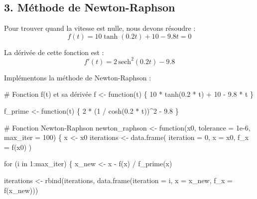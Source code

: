 \documentclass[
  12pt,
  letterpaper,
]{book}
\newenvironment{Shaded}{}{}
\newcommand{\AttributeTok}[1]{\textcolor[rgb]{0.84,0.23,0.29}{#1}}
\newcommand{\CommentTok}[1]{\textcolor[rgb]{0.42,0.45,0.49}{#1}}
\newcommand{\ControlFlowTok}[1]{\textcolor[rgb]{0.84,0.23,0.29}{#1}}
\newcommand{\DecValTok}[1]{\textcolor[rgb]{0.00,0.36,0.77}{#1}}
\newcommand{\FloatTok}[1]{\textcolor[rgb]{0.00,0.36,0.77}{#1}}
\newcommand{\FunctionTok}[1]{\textcolor[rgb]{0.44,0.26,0.76}{#1}}
\newcommand{\NormalTok}[1]{\textcolor[rgb]{0.14,0.16,0.18}{#1}}
\newcommand{\OtherTok}[1]{\textcolor[rgb]{0.44,0.26,0.76}{#1}}
\newcommand{\SpecialCharTok}[1]{\textcolor[rgb]{0.00,0.36,0.77}{#1}}
\theoremstyle{remark}
\begin{document}
\subsection{3. Méthode de
Newton-Raphson}\label{muxe9thode-de-newton-raphson}

Pour trouver quand la vitesse est nulle, nous devons résoudre :
\[f(t) = 10\tanh(0.2t) + 10 - 9.8t = 0\]

La dérivée de cette fonction est :
\[f'(t) = 2\,\text{sech}^2(0.2t) - 9.8\]

Implémentons la méthode de Newton-Raphson :

\begin{Shaded}
\begin{Highlighting}[]
\CommentTok{\# Fonction f(t) et sa dérivée}
\NormalTok{f }\OtherTok{\textless{}{-}} \ControlFlowTok{function}\NormalTok{(t) \{}
  \DecValTok{10} \SpecialCharTok{*} \FunctionTok{tanh}\NormalTok{(}\FloatTok{0.2} \SpecialCharTok{*}\NormalTok{ t) }\SpecialCharTok{+} \DecValTok{10} \SpecialCharTok{{-}} \FloatTok{9.8} \SpecialCharTok{*}\NormalTok{ t}
\NormalTok{\}}

\NormalTok{f\_prime }\OtherTok{\textless{}{-}} \ControlFlowTok{function}\NormalTok{(t) \{}
  \DecValTok{2} \SpecialCharTok{*}\NormalTok{ (}\DecValTok{1} \SpecialCharTok{/} \FunctionTok{cosh}\NormalTok{(}\FloatTok{0.2} \SpecialCharTok{*}\NormalTok{ t))}\SpecialCharTok{\^{}}\DecValTok{2} \SpecialCharTok{{-}} \FloatTok{9.8}
\NormalTok{\}}

\CommentTok{\# Fonction Newton{-}Raphson}
\NormalTok{newton\_raphson }\OtherTok{\textless{}{-}} \ControlFlowTok{function}\NormalTok{(x0, }\AttributeTok{tolerance =} \FloatTok{1e{-}6}\NormalTok{, }\AttributeTok{max\_iter =} \DecValTok{100}\NormalTok{) \{}
\NormalTok{  x }\OtherTok{\textless{}{-}}\NormalTok{ x0}
\NormalTok{  iterations }\OtherTok{\textless{}{-}} \FunctionTok{data.frame}\NormalTok{(}
    \AttributeTok{iteration =} \DecValTok{0}\NormalTok{,}
    \AttributeTok{x =}\NormalTok{ x0,}
    \AttributeTok{f\_x =} \FunctionTok{f}\NormalTok{(x0)}
\NormalTok{  )}
  
  \ControlFlowTok{for}\NormalTok{ (i }\ControlFlowTok{in} \DecValTok{1}\SpecialCharTok{:}\NormalTok{max\_iter) \{}
\NormalTok{    x\_new }\OtherTok{\textless{}{-}}\NormalTok{ x }\SpecialCharTok{{-}} \FunctionTok{f}\NormalTok{(x) }\SpecialCharTok{/} \FunctionTok{f\_prime}\NormalTok{(x)}
    
\NormalTok{    iterations }\OtherTok{\textless{}{-}} \FunctionTok{rbind}\NormalTok{(iterations, }
                       \FunctionTok{data.frame}\NormalTok{(}\AttributeTok{iteration =}\NormalTok{ i,}
                                \AttributeTok{x =}\NormalTok{ x\_new,}
                                \AttributeTok{f\_x =} \FunctionTok{f}\NormalTok{(x\_new)))}
    

\end{Highlighting}
\end{Shaded}
\end{document}
